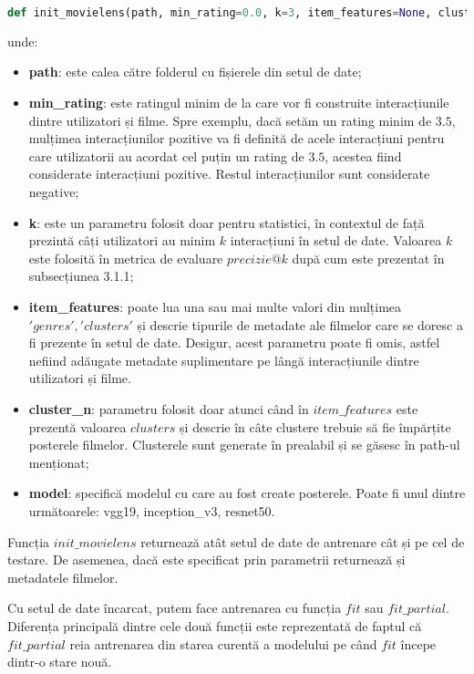 \begin{lstlisting}[language=Python, caption=Funcția de inițializare a bazei de date]
def init_movielens(path, min_rating=0.0, k=3, item_features=None, cluster_n=18, model='vgg19')
\end{lstlisting}
unde:
\begin{itemize}
	\item \textbf{path}: este calea către folderul cu fișierele din setul de date;
	\item \textbf{min\_rating}: este ratingul minim de la care vor fi construite interacțiunile dintre utilizatori și filme. Spre exemplu, dacă setăm un rating minim de $3.5$, mulțimea interacțiunilor pozitive va fi definită de acele interacțiuni pentru care utilizatorii au acordat cel puțin un rating de $3.5$, acestea fiind considerate interacțiuni pozitive. Restul interacțiunilor sunt considerate negative;
	\item \textbf{k}: este un parametru folosit doar pentru statistici, în contextul de față prezintă câți utilizatori au minim $k$ interacțiuni în setul de date. Valoarea $k$ este folosită în metrica de evaluare $precizie@k$ după cum este prezentat în subsecțiunea 3.1.1; 
	\item \textbf{item\_features}: poate lua una sau mai multe valori din mulțimea ${'genres', 'clusters'}$ și descrie tipurile de metadate ale filmelor care se doresc a fi prezente în setul de date. Desigur, acest parametru poate fi omis, astfel nefiind adăugate metadate suplimentare pe lângă interacțiunile dintre utilizatori și filme.
	\item \textbf{cluster\_n}: parametru folosit doar atunci când în $item\_features$ este prezentă valoarea $clusters$ și descrie în câte clustere trebuie să fie împărțite posterele filmelor. Clusterele sunt generate în prealabil și se găsesc în path-ul menționat;
	\item \textbf{model}: specifică modelul cu care au fost create posterele. Poate fi unul dintre următoarele: vgg19, inception\_v3, resnet50.
\end{itemize}
Funcția $init\_movielens$ returnează atât setul de date de antrenare cât și pe cel de testare. De asemenea, dacă este specificat prin parametrii returnează și metadatele filmelor.

Cu setul de date încarcat, putem face antrenarea cu funcția $fit$ sau $fit\_partial$. Diferența principală dintre cele două funcții este reprezentată de faptul că $fit\_partial$ reia antrenarea din starea curentă a modelului pe când $fit$ începe dintr-o stare nouă. 

